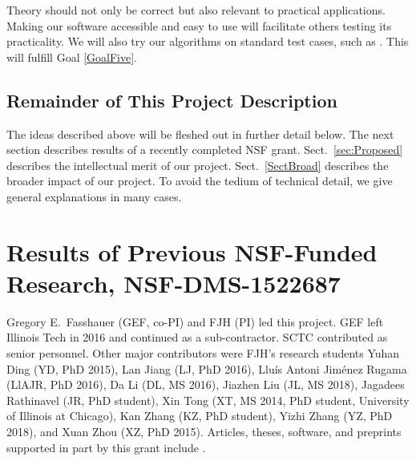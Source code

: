 \documentclass[11pt]{NSFamsart}
\begin{document}
Theory should not only be correct but also relevant to practical applications.  Making our software accessible and easy to use will facilitate others testing its practicality.  We will also try our algorithms on standard test cases, such as \cite{VirLib17a}.  This will fulfill Goal \ref{GoalFive}.

\subsection{Remainder of This Project Description}

The ideas described above will be fleshed out in further detail below.  The next section describes results of a recently completed NSF grant.  Sect.\ \ref{sec:Proposed} describes the intellectual merit of our project.  Sect.\ \ref{SectBroad} describes the broader impact of our project.  To avoid the tedium of technical detail, we give general explanations in many cases. 

\section{Results of Previous NSF-Funded Research,
NSF-DMS-1522687} \label{sec:Previous}


Gregory E.\ Fasshauer (GEF, co-PI) and FJH (PI) led this project.  GEF left Illinois Tech in 2016 and continued as a sub-contractor.  
SCTC contributed as senior personnel.  Other major contributors were FJH's research students Yuhan Ding (YD, PhD 2015), Lan Jiang (LJ, PhD 2016), 
Llu\'is Antoni Jim\'enez Rugama (LlAJR, PhD 2016), Da Li (DL, MS 2016), Jiazhen Liu (JL, MS 2018), Jagadees Rathinavel (JR, 
PhD student), Xin Tong (XT, MS 2014, PhD student, University of Illinois at Chicago), Kan Zhang (KZ, PhD 
student), Yizhi Zhang (YZ, PhD 2018), and Xuan Zhou (XZ, PhD 2015).  Articles, theses,  
software, and preprints supported in 
part by this 
grant 
include 
\cite{ala_augmented_2017, 
	ChoEtal17a,
	ChoEtal17b,
	Din15a, 
	DinHic20a,
	GilEtal16a,
	Hic17a,
	HicJag18b,
	HicJim16a,
	HicEtal18a,
	HicEtal17a,
	HicKriWoz19a,
	RatHic19a,
	GilJim16b,
	JimHic16a,
	JohFasHic18a,
	Li16a,
	Liu17a,
	MarEtal18a,
	mccourt_stable_2017,
	MCCEtal19a,
	mishra_hybrid_2018,
	MisEtal19a,
	rashidinia_stable_2016,
	rashidinia_stable_2018,
	Zha18a,
	Zha17a,
	Zho15a,
	ZhoHic15a}.
\end{document}
